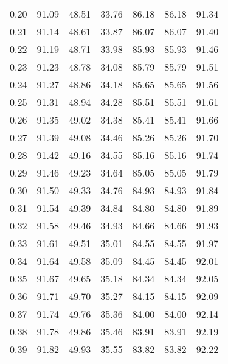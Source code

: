 \begin{tabular}{|c|c|c|c|c|c|c|}
      0.20 &     91.09 &     48.51 &      33.76 &   86.18 &      86.18 &         91.34 \\
      0.21 &     91.14 &     48.61 &      33.87 &   86.07 &      86.07 &         91.40 \\
      0.22 &     91.19 &     48.71 &      33.98 &   85.93 &      85.93 &         91.46 \\
      0.23 &     91.23 &     48.78 &      34.08 &   85.79 &      85.79 &         91.51 \\
      0.24 &     91.27 &     48.86 &      34.18 &   85.65 &      85.65 &         91.56 \\
      0.25 &     91.31 &     48.94 &      34.28 &   85.51 &      85.51 &         91.61 \\
      0.26 &     91.35 &     49.02 &      34.38 &   85.41 &      85.41 &         91.66 \\
      0.27 &     91.39 &     49.08 &      34.46 &   85.26 &      85.26 &         91.70 \\
      0.28 &     91.42 &     49.16 &      34.55 &   85.16 &      85.16 &         91.74 \\
      0.29 &     91.46 &     49.23 &      34.64 &   85.05 &      85.05 &         91.79 \\
      0.30 &     91.50 &     49.33 &      34.76 &   84.93 &      84.93 &         91.84 \\
      0.31 &     91.54 &     49.39 &      34.84 &   84.80 &      84.80 &         91.89 \\
      0.32 &     91.58 &     49.46 &      34.93 &   84.66 &      84.66 &         91.93 \\
      0.33 &     91.61 &     49.51 &      35.01 &   84.55 &      84.55 &         91.97 \\
      0.34 &     91.64 &     49.58 &      35.09 &   84.45 &      84.45 &         92.01 \\
      0.35 &     91.67 &     49.65 &      35.18 &   84.34 &      84.34 &         92.05 \\
      0.36 &     91.71 &     49.70 &      35.27 &   84.15 &      84.15 &         92.09 \\
      0.37 &     91.74 &     49.76 &      35.36 &   84.00 &      84.00 &         92.14 \\
      0.38 &     91.78 &     49.86 &      35.46 &   83.91 &      83.91 &         92.19 \\
      0.39 &     91.82 &     49.93 &      35.55 &   83.82 &      83.82 &         92.22 \\

\end{tabular}
